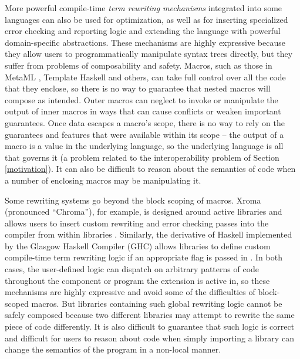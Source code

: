 More powerful compile-time \emph{term rewriting mechanisms} integrated into some languages can also be used for optimization, as well as for inserting specialized error checking and reporting\- logic and extending the language with powerful domain-specific abstractions. These mechanisms are highly expressive because they allow users to programmatically manipulate syntax trees directly, but they suffer from problems of composability and safety. Macros, such as those in MetaML \cite{metaml}, Template Haskell \cite{template_haskell} and others, can take full control over all the code that they enclose, so there is no way to guarantee that nested macros will compose as intended. Outer macros can neglect to invoke or  manipulate the output of inner macros in ways that can cause conflicts or weaken important guarantees. Once data escapes a macro's scope, there is no way to rely on the guarantees and features that were available within its scope -- the output of a macro is a value in the underlying language, so the underlying language is all that governs it (a problem related to the interoperability problem of Section \ref{motivation}). It can also be difficult to reason about the semantics of code when a number of enclosing macros may be manipulating it.

Some rewriting systems go beyond the block scoping of macros. Xroma (pronounced ``Chroma''), for example, is designed around active libraries and allows users to insert custom rewriting and error checking passes into the compiler from within libraries \cite{xroma}. Similarly, the derivative of Haskell implemented by the Glasgow Haskell Compiler (GHC) allows libraries to define custom compile-time term rewriting logic if an appropriate flag is passed in \cite{haskell-rewrite}. In both cases, the user-defined logic can dispatch on arbitrary patterns of code throughout the component or program the extension is active in, so these mechanisms are highly expressive and avoid some of the difficulties of block-scoped macros. But libraries containing such global rewriting logic cannot be safely composed because two different libraries may attempt to rewrite the same piece of code differently. It is also difficult to guarantee that such logic is correct and difficult for users to reason about code when simply importing a library can change the semantics of the program in a non-local manner.

